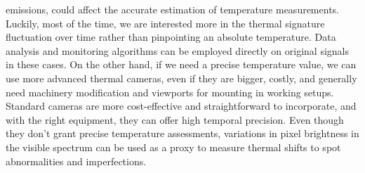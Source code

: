 emissions, could affect the accurate estimation of temperature measurements. Luckily, most of the time, we are interested more in the thermal signature fluctuation over time rather than pinpointing an absolute temperature. Data analysis and monitoring algorithms can be employed directly on original signals in these cases. On the other hand, if we need a precise temperature value, we can use more advanced thermal cameras, even if they are bigger, costly, and generally need machinery modification and viewports for mounting in working setups. Standard cameras are more cost-effective and straightforward to incorporate, and with the right equipment, they can offer high temporal precision. Even though they don't grant precise temperature assessments, variations in pixel brightness in the visible spectrum can be used as a proxy to measure thermal shifts to spot abnormalities and imperfections. 
